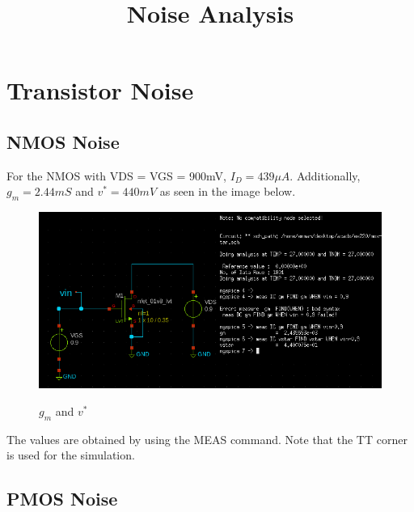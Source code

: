 \documentclass[conference]{IEEEtran}
\begin{document}
 


\title{Noise Analysis}

\author{
}

\maketitle
\section{Transistor Noise}
\subsection{NMOS Noise}
For the NMOS with VDS = VGS = 900mV, $I_D=439\mu A$. Additionally, $g_m=2.44mS$ and $v^*=440mV$ as seen in the image below.
\begin{figure}[H]
	\centering
	\includegraphics[scale=0.32]{gm-vstar.png}
	\label{label:gm-vstar-NMOS} 
	\caption{$g_m$ and $v^*$}
\end{figure}
The values are obtained by using the MEAS command. Note that the TT corner is used for the simulation. 

\subsection{PMOS Noise}
\end{document}
